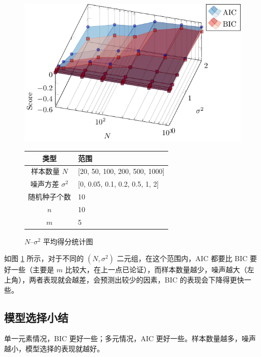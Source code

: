     \begin{figure}
        \begin{minipage}[c]{.5\linewidth}
            \centering
            \includegraphics[width=\linewidth]{fig/Ns.pdf}
            \caption{$N$--$\sigma^2$ 平均得分统计图}\label{fig:Ns}
        \end{minipage}
        \begin{minipage}[b]{.5\linewidth}
            \centering
            \begin{tabular}{cl}
                \toprule
                类型 & 范围 \\
                \midrule
                样本数量 $N$ & [20, 50, 100, 200, 500, 1000] \\
                噪声方差 $\sigma^2$ & [0, 0.05, 0.1, 0.2, 0.5, 1, 2] \\
                随机种子个数 & 10 \\
                \midrule
                $n$ & 10 \\
                $m$ & 5 \\
                \bottomrule
            \end{tabular}
        \end{minipage}
    \end{figure}

    如图 \ref{fig:Ns} 所示，对于不同的 $(N,\sigma^2)$ 二元组，在这个范围内，AIC 都要比 BIC 要好一些（主要是 $m$ 比较大，在上一点已论证），而样本数量越少，噪声越大（左上角），两者表现就会越差，会预测出较少的因素，BIC 的表现会下降得更快一些。

    \subsection{模型选择小结}

    单一元素情况，BIC 更好一些；多元情况，AIC 更好一些。样本数量越多，噪声越小，模型选择的表现就越好。

